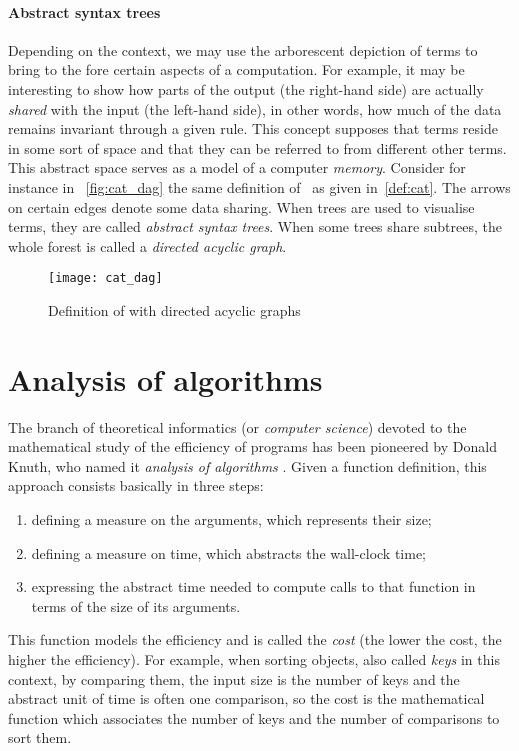 \paragraph{Abstract syntax trees}

Depending on the context, we may use the arborescent depiction of
terms to bring to the fore certain aspects of a computation. For
example, it may be interesting to show how parts of the output (the
right\hyp{}hand side) are actually \emph{shared} with
the input (the left\hyp{}hand side), in other words, how much of the
data remains invariant through a given rule. This concept supposes
that terms reside in some sort of space and that they can be referred
to from different other terms. This abstract space serves as a model
of a computer \emph{memory}. Consider for instance in
\fig~\vref{fig:cat_dag} the same definition of~ as given
in~\eqref{def:cat}. The arrows on certain edges denote some data
sharing. When trees are used to visualise terms, they are called
\emph{abstract syntax trees}. When
some trees share subtrees, the whole forest is called a \emph{directed
  acyclic graph}.
\begin{figure}%
\centering
\texttt{[image: cat\_dag]}
\caption{Definition of  with directed acyclic graphs
\label{fig:cat_dag}}
\end{figure}

\section{Analysis of algorithms}

The branch of theoretical informatics (or \emph{computer science})
devoted to the mathematical study of the efficiency of programs has
been pioneered by Donald Knuth, who named it \emph{analysis of
  algorithms} \citep{SedgewickFlajolet_1996,Knuth_1997}. Given a
function definition, this approach consists basically in three steps:
\begin{enumerate}

  \item defining a measure on the arguments, which represents their
    size;

  \item defining a measure on time, which abstracts the
    wall\hyp{}clock time;

  \item expressing the abstract time needed to compute calls to that
    function in terms of the size of its arguments.

\end{enumerate}
This function models the efficiency and is called the
\emph{cost} (the lower the cost, the higher the
efficiency). For example, when sorting objects, also called
\emph{keys} in this context, by comparing
them, the input size is the number of keys and the abstract unit of
time is often one comparison, so the cost is the mathematical function
which associates the number of keys and the number of comparisons to
sort them.


